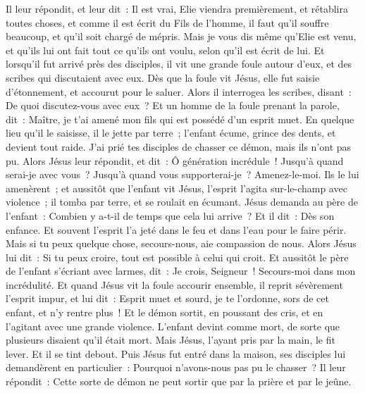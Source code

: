 \begin{multicols}{2}
Il leur répondit, et leur dit~: Il est vrai, Elie viendra premièrement, et rétablira toutes choses, et comme il est écrit du Fils de l'homme, il faut qu'il souffre beaucoup, et qu'il soit chargé de mépris.
Mais je vous dis même qu'Elie est venu, et qu'ils lui ont fait tout ce qu'ils ont voulu, selon qu'il est écrit de lui.
Et lorsqu'il fut arrivé près des disciples, il vit une grande foule autour d'eux, et des scribes qui discutaient avec eux.
Dès que la foule vit Jésus, elle fut saisie d'étonnement, et accourut pour le saluer.
Alors il interrogea les scribes, disant~: De quoi discutez-vous avec eux~?
Et un homme de la foule prenant la parole, dit~: Maître, je t'ai amené mon fils qui est possédé d'un esprit muet.
En quelque lieu qu'il le saisisse, il le jette par terre~; l'enfant écume, grince des dents, et devient tout raide. J'ai prié tes disciples de chasser ce démon, mais ils n'ont pas pu.
Alors Jésus leur répondit, et dit~: Ô génération incrédule~! Jusqu'à quand serai-je avec vous~? Jusqu'à quand vous supporterai-je~? Amenez-le-moi. Ils le lui amenèrent~;
et aussitôt que l'enfant vit Jésus, l'esprit l'agita sur-le-champ avec violence~; il tomba par terre, et se roulait en écumant.
Jésus demanda au père de l'enfant~: Combien y a-t-il de temps que cela lui arrive~? Et il dit~: Dès son enfance.
Et souvent l'esprit l'a jeté dans le feu et dans l'eau pour le faire périr. Mais si tu peux quelque chose, secours-nous, aie compassion de nous.
Alors Jésus lui dit~: Si tu peux croire, tout est possible à celui qui croit.
Et aussitôt le père de l'enfant s'écriant avec larmes, dit~: Je crois, Seigneur~! Secours-moi dans mon incrédulité.
Et quand Jésus vit la foule accourir ensemble, il reprit sévèrement l'esprit impur, et lui dit~: Esprit muet et sourd, je te l'ordonne, sors de cet enfant, et n'y rentre plus~!
Et le démon sortit, en poussant des cris, et en l'agitant avec une grande violence. L'enfant devint comme mort, de sorte que plusieurs disaient qu'il était mort.
Mais Jésus, l'ayant pris par la main, le fit lever. Et il se tint debout.
Puis Jésus fut entré dans la maison, ses disciples lui demandèrent en particulier~: Pourquoi n'avons-nous pas pu le chasser~?
Il leur répondit~: Cette sorte de démon ne peut sortir que par la prière et par le jeûne.

\end{multicols}
